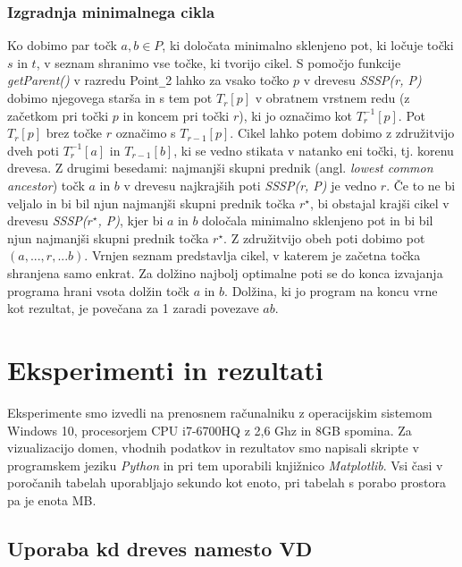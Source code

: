 \documentclass[a4paper, 12pt]{book}
\newcommand{\U}{\texttt{\_}}
\begin{document}
\subsection{Izgradnja minimalnega cikla}
Ko dobimo par točk $a, b\in P$, ki določata minimalno sklenjeno pot, ki ločuje točki $s$ in $t$, v seznam shranimo vse točke, ki tvorijo cikel. S pomočjo funkcije \textit{getParent()} v razredu Point\U 2 lahko za vsako točko $p$ v drevesu \textit{SSSP(r, P)} dobimo njegovega starša in s tem pot $T_r[p]$ v obratnem vrstnem redu (z začetkom pri točki $p$ in koncem pri točki $r$), ki jo označimo kot $T_r^{-1}[p]$. Pot $T_r[p]$ brez točke $r$ označimo s $T_{r-1}[p]$. Cikel lahko potem dobimo z združitvijo dveh poti $T_r^{-1}[a]$ in $T_{r-1}[b]$, ki se vedno stikata v natanko eni točki, tj. korenu drevesa. Z drugimi besedami: najmanjši skupni prednik (angl. \textit{lowest common ancestor}) točk $a$ in $b$ v drevesu najkrajših poti \textit{SSSP(r, P)} je vedno $r$. Če to ne bi veljalo in bi bil njun najmanjši skupni prednik točka $r^\star$, bi obstajal krajši cikel v drevesu \textit{SSSP($r^\star$, P)}, kjer bi $a$ in $b$ določala minimalno sklenjeno pot in bi bil njun najmanjši skupni prednik točka $r^\star$. Z združitvijo obeh poti dobimo pot $(a,...,r,...b)$. Vrnjen seznam predstavlja cikel, v katerem je začetna točka shranjena samo enkrat. Za dolžino najbolj optimalne poti se do konca izvajanja programa hrani vsota dolžin točk $a$ in $b$. Dolžina, ki jo program na koncu vrne kot rezultat, je povečana za 1 zaradi povezave $ab$. 

\chapter{Eksperimenti in rezultati}
\label{Rezultati}
Eksperimente smo izvedli na prenosnem računalniku z operacijskim sistemom Windows 10, procesorjem CPU i7-6700HQ z 2,6 Ghz in 8GB spomina. Za vizualizacijo domen, vhodnih podatkov in rezultatov smo napisali skripte v programskem jeziku \textit{Python} in pri tem uporabili knjižnico \textit{Matplotlib}. Vsi časi v poročanih tabelah uporabljajo sekundo kot enoto, pri tabelah s porabo prostora pa je enota MB.
\section{Uporaba kd dreves namesto VD}
\end{document}
